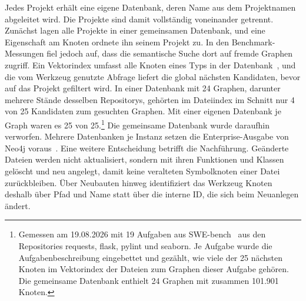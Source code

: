 Jedes Projekt erhält eine eigene Datenbank, deren Name aus dem Projektnamen abgeleitet wird. Die Projekte sind damit vollständig voneinander getrennt. Zunächst lagen alle Projekte in einer gemeinsamen Datenbank, und eine Eigenschaft am Knoten ordnete ihn seinem Projekt zu. In den Benchmark-Messungen fiel jedoch auf, dass die semantische Suche dort auf fremde Graphen zugriff. Ein Vektorindex umfasst alle Knoten eines Typs in der Datenbank~\parencite{neo4jvector}, und die vom Werkzeug genutzte Abfrage liefert die global nächsten Kandidaten, bevor auf das Projekt gefiltert wird. In einer Datenbank mit 24 Graphen, darunter mehrere Stände desselben Repositorys, gehörten im Dateiindex im Schnitt nur 4 von 25 Kandidaten zum gesuchten Graphen. Mit einer eigenen Datenbank je Graph waren es 25 von 25.\footnote{Gemessen am 19.08.2026 mit 19 Aufgaben aus SWE-bench~\parencite{jimenez2024swebench} aus den Repositories requests, flask, pylint und seaborn. Je Aufgabe wurde die Aufgabenbeschreibung eingebettet und gezählt, wie viele der 25 nächsten Knoten im Vektorindex der Dateien zum Graphen dieser Aufgabe gehören. Die gemeinsame Datenbank enthielt 24 Graphen mit zusammen 101.901 Knoten.} Die gemeinsame Datenbank wurde daraufhin verworfen. Mehrere Datenbanken je Instanz setzen die Enterprise-Ausgabe von Neo4j voraus~\parencite{neo4jdbadmin}. Eine weitere Entscheidung betrifft die Nachführung. Geänderte Dateien werden nicht aktualisiert, sondern mit ihren Funktionen und Klassen gelöscht und neu angelegt, damit keine veralteten Symbolknoten einer Datei zurückbleiben. Über Neubauten hinweg identifiziert das Werkzeug Knoten deshalb über Pfad und Name statt über die interne ID, die sich beim Neuanlegen ändert.

